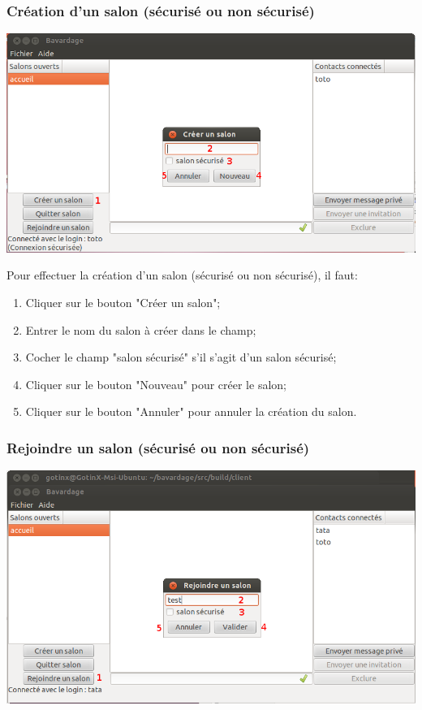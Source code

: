 \documentclass[a4paper,11pt,french]{book}
\begin{document}
\subsubsection{Création d'un salon (sécurisé ou non sécurisé)}

\includegraphics[width=40em]{capture/cre_room.png}

Pour effectuer la création d'un salon (sécurisé ou non sécurisé), il faut:
\begin{enumerate}
    \item Cliquer sur le bouton "Créer un salon";
    \item Entrer le nom du salon à créer dans le champ;
    \item Cocher le champ "salon sécurisé" s'il s'agit d'un salon sécurisé;
    \item Cliquer sur le bouton "Nouveau" pour créer le salon;
    \item Cliquer sur le bouton "Annuler" pour annuler la création du salon.
\end{enumerate}
\newpage

\subsubsection{Rejoindre un salon (sécurisé ou non sécurisé)}

\includegraphics[width=40em]{capture/rej_sal.png}
\end{document}
